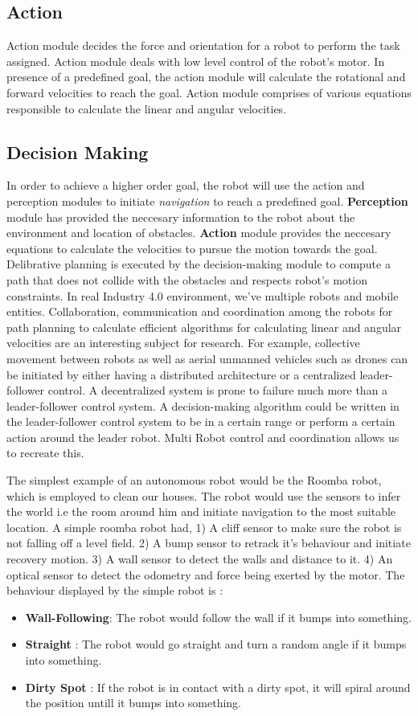 \subsection{Action}
Action module decides the force and orientation for a robot to perform the task assigned. Action module deals with low level control of the robot's motor. In presence of a predefined goal, 
the action module will calculate the rotational and forward velocities to reach the goal. Action module comprises of various equations responsible to calculate the linear and angular velocities.
\subsection{Decision Making}
In order to achieve a higher order goal, the robot will use the action and perception modules to initiate \textit{navigation} to reach a predefined goal. 
\textbf{Perception} module has provided the neccesary information to the robot about the environment and location of obstacles. \textbf{Action} module provides 
the neccesary equations to calculate the velocities to pursue the motion towards the goal. Delibrative planning is executed by the decision-making module to compute a 
path that does not collide with the obstacles and respects robot's motion constraints. In real Industry 4.0 environment, we've multiple robots and mobile entities. Collaboration, communication
and coordination among the robots for path planning to calculate efficient algorithms for calculating linear and angular velocities are an interesting subject for research.
For example, collective movement between robots as well as aerial unmanned vehicles such as drones can be initiated by either having a distributed architecture or a centralized leader-follower control.
A decentralized system is prone to failure much more than a leader-follower control system. A decision-making algorithm could be written in the leader-follower control system to be in a certain range
or perform a certain action around the leader robot. Multi Robot control and coordination allows us to recreate this. 

The simplest example of an autonomous robot would be the Roomba robot, which is employed to clean our houses. The robot would use the sensors to infer the world i.e the room around him and 
initiate navigation to the most suitable location. A simple roomba robot had, 1) A cliff sensor to make sure the robot is not falling off a level field. 2) A bump sensor to retrack it's behaviour and initiate recovery motion. 3) A wall sensor to detect the walls and distance to it. 4) An optical sensor to detect the odometry and force being exerted by the motor.
The behaviour displayed by the simple robot is :  
\begin{itemize}
    \item \textbf{Wall-Following}: The robot would follow the wall if it bumps into something.
    \item \textbf{Straight} : The robot would go straight and turn a random angle if it bumps into something.
    \item \textbf{Dirty Spot} : If the robot is in contact with a dirty spot, it will spiral around the position untill it bumps into something.
\end{itemize}

